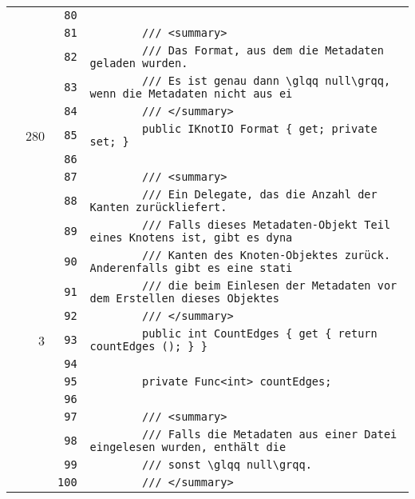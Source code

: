 \documentclass[a4paper,10pt]{article}
\begin{document}
\begin{longtable}[l]{lrrl}
\cellcolor{gray} &  & \verb~80~ & \verb~~\\
\cellcolor{gray} &  & \verb~81~ & \verb~        /// <summary>~\\
\cellcolor{gray} &  & \verb~82~ & \verb~        /// Das Format, aus dem die Metadaten geladen wurden.~\\
\cellcolor{gray} &  & \verb~83~ & \verb~        /// Es ist genau dann \glqq null\grqq, wenn die Metadaten nicht aus ei~\\
\cellcolor{gray} &  & \verb~84~ & \verb~        /// </summary>~\\
\cellcolor{green} & 280 & \verb~85~ & \verb~        public IKnotIO Format { get; private set; }~\\
\cellcolor{gray} &  & \verb~86~ & \verb~~\\
\cellcolor{gray} &  & \verb~87~ & \verb~        /// <summary>~\\
\cellcolor{gray} &  & \verb~88~ & \verb~        /// Ein Delegate, das die Anzahl der Kanten zurückliefert.~\\
\cellcolor{gray} &  & \verb~89~ & \verb~        /// Falls dieses Metadaten-Objekt Teil eines Knotens ist, gibt es dyna~\\
\cellcolor{gray} &  & \verb~90~ & \verb~        /// Kanten des Knoten-Objektes zurück. Anderenfalls gibt es eine stati~\\
\cellcolor{gray} &  & \verb~91~ & \verb~        /// die beim Einlesen der Metadaten vor dem Erstellen dieses Objektes ~\\
\cellcolor{gray} &  & \verb~92~ & \verb~        /// </summary>~\\
\cellcolor{green} & 3 & \verb~93~ & \verb~        public int CountEdges { get { return countEdges (); } }~\\
\cellcolor{gray} &  & \verb~94~ & \verb~~\\
\cellcolor{gray} &  & \verb~95~ & \verb~        private Func<int> countEdges;~\\
\cellcolor{gray} &  & \verb~96~ & \verb~~\\
\cellcolor{gray} &  & \verb~97~ & \verb~        /// <summary>~\\
\cellcolor{gray} &  & \verb~98~ & \verb~        /// Falls die Metadaten aus einer Datei eingelesen wurden, enthält die~\\
\cellcolor{gray} &  & \verb~99~ & \verb~        /// sonst \glqq null\grqq.~\\
\cellcolor{gray} &  & \verb~100~ & \verb~        /// </summary>~\\

\end{longtable}
\end{document}
